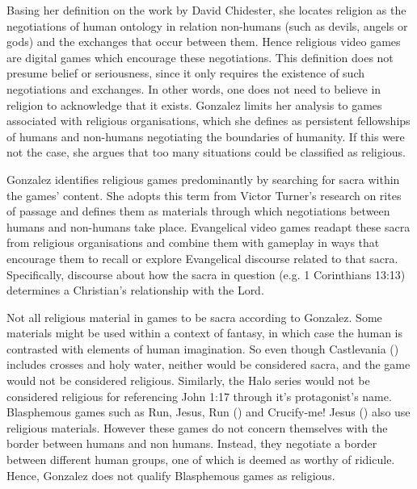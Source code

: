 
Basing her definition on the work by David Chidester, she locates religion as the negotiations of human ontology in relation non-humans (such as devils, angels or gods) and the exchanges that occur between them. Hence religious video games are digital games which encourage these negotiations. This definition does not presume belief or seriousness, since it only requires the existence of such negotiations and exchanges. In other words, one does not need to believe in religion to acknowledge that it exists. Gonzalez limits her analysis to games associated with religious organisations, which she defines as persistent fellowships of humans and non-humans negotiating the boundaries of humanity. If this were not the case, she argues that too many situations could be classified as religious.
 
Gonzalez identifies religious games predominantly by searching for sacra within the games' content. She adopts this term from Victor Turner’s research on rites of passage and defines them as materials through which negotiations between humans and non-humans take place. Evangelical video games readapt these sacra from religious organisations and combine them with gameplay in ways that encourage them to recall or explore Evangelical discourse related to that sacra. Specifically, discourse about how the sacra in question (e.g. 1 Corinthians 13:13) determines a Christian’s relationship with the Lord.


Not all religious material in games to be sacra according to Gonzalez. Some materials might be used within a context of fantasy, in which case the human is contrasted with elements of human imagination. So even though Castlevania () includes crosses and holy water, neither would be considered sacra, and the game would not be considered religious. Similarly, the Halo series would not be considered religious for referencing John 1:17 through it’s protagonist’s name. Blasphemous games such as Run, Jesus, Run () and Crucify-me! Jesus () also use religious materials. However these games do not concern themselves with the border between humans and non humans. Instead, they negotiate a border between different human groups, one of which is deemed as worthy of ridicule. Hence, Gonzalez does not qualify Blasphemous games as religious.


